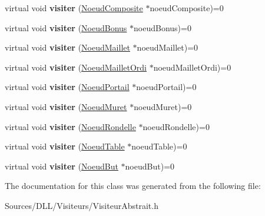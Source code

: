 \begin{DoxyCompactItemize}
\item 
virtual void {\bfseries visiter} (\hyperlink{class_noeud_composite}{Noeud\+Composite} $\ast$noeud\+Composite)=0\hypertarget{class_visiteur_abstrait_a28c0b5d5f480cdf5db02b91022df5eb6}{}\label{class_visiteur_abstrait_a28c0b5d5f480cdf5db02b91022df5eb6}

\item 
virtual void {\bfseries visiter} (\hyperlink{class_noeud_bonus}{Noeud\+Bonus} $\ast$noeud\+Bonus)=0\hypertarget{class_visiteur_abstrait_ac2ac1d0d7e73f571df47559e8fb68c3e}{}\label{class_visiteur_abstrait_ac2ac1d0d7e73f571df47559e8fb68c3e}

\item 
virtual void {\bfseries visiter} (\hyperlink{class_noeud_maillet}{Noeud\+Maillet} $\ast$noeud\+Maillet)=0\hypertarget{class_visiteur_abstrait_a03a6482e7433dc16c0e10875bade75e4}{}\label{class_visiteur_abstrait_a03a6482e7433dc16c0e10875bade75e4}

\item 
virtual void {\bfseries visiter} (\hyperlink{class_noeud_maillet_ordi}{Noeud\+Maillet\+Ordi} $\ast$noeud\+Maillet\+Ordi)=0\hypertarget{class_visiteur_abstrait_ad3c2b7e1b0d32ae119292e4b3b4501c7}{}\label{class_visiteur_abstrait_ad3c2b7e1b0d32ae119292e4b3b4501c7}

\item 
virtual void {\bfseries visiter} (\hyperlink{class_noeud_portail}{Noeud\+Portail} $\ast$noeud\+Portail)=0\hypertarget{class_visiteur_abstrait_aae185ddb4398a4228ba3ade46c57730a}{}\label{class_visiteur_abstrait_aae185ddb4398a4228ba3ade46c57730a}

\item 
virtual void {\bfseries visiter} (\hyperlink{class_noeud_muret}{Noeud\+Muret} $\ast$noeud\+Muret)=0\hypertarget{class_visiteur_abstrait_ab9eeefd14e89f3b953c58c4ff5f70c56}{}\label{class_visiteur_abstrait_ab9eeefd14e89f3b953c58c4ff5f70c56}

\item 
virtual void {\bfseries visiter} (\hyperlink{class_noeud_rondelle}{Noeud\+Rondelle} $\ast$noeud\+Rondelle)=0\hypertarget{class_visiteur_abstrait_ac75291599907cfd911d7b74bb91d6652}{}\label{class_visiteur_abstrait_ac75291599907cfd911d7b74bb91d6652}

\item 
virtual void {\bfseries visiter} (\hyperlink{class_noeud_table}{Noeud\+Table} $\ast$noeud\+Table)=0\hypertarget{class_visiteur_abstrait_ac22720d85f2b6792b0410e9984ac110a}{}\label{class_visiteur_abstrait_ac22720d85f2b6792b0410e9984ac110a}

\item 
virtual void {\bfseries visiter} (\hyperlink{class_noeud_but}{Noeud\+But} $\ast$noeud\+But)=0\hypertarget{class_visiteur_abstrait_a2a8f0d67c410146e44b09fc0154e94a7}{}\label{class_visiteur_abstrait_a2a8f0d67c410146e44b09fc0154e94a7}

\end{DoxyCompactItemize}


The documentation for this class was generated from the following file\+:\begin{DoxyCompactItemize}
\item 
Sources/\+D\+L\+L/\+Visiteurs/Visiteur\+Abstrait.\+h\end{DoxyCompactItemize}

